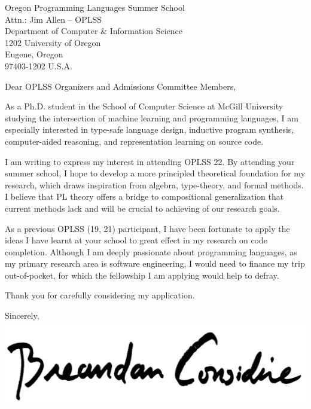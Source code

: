 \documentclass{letter}
\begin{document}
    \begin{letter}{Oregon Programming Languages Summer School\\Attn.: Jim Allen -- OPLSS\\Department of Computer \& Information Science\\1202 University of Oregon\\Eugene, Oregon\\97403-1202 U.S.A.}
        \opening{Dear OPLSS Organizers and Admissions Committee Members,}
        As a Ph.D. student in the School of Computer Science at McGill University studying the intersection of machine learning and programming languages, I am especially interested in type-safe language design, inductive program synthesis, computer-aided reasoning, and representation learning on source code.

        I am writing to express my interest in attending OPLSS \textsc{}22. By attending your summer school, I hope to develop a more principled theoretical foundation for my research, which draws inspiration from algebra, type-theory, and formal methods. I believe that PL theory offers a bridge to compositional generalization that current methods lack and will be crucial to achieving of our research goals.

        As a previous OPLSS (\textsc{}19, \textsc{}21) participant, I have been fortunate to apply the ideas I have learnt at your school to great effect in my research on code completion. Although I am deeply passionate about programming languages, as my primary research area is software engineering, I would need to finance my trip out-of-pocket, for which the fellowship I am applying would help to defray.

        Thank you for carefully considering my application.

        \closing{Sincerely,\\
        \includegraphics[scale=0.06]{signature}\\
        }
    \end{letter}
\end{document}
